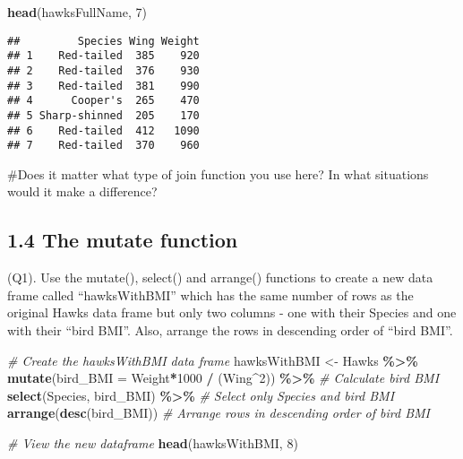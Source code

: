 \documentclass[
]{article}
\newenvironment{Shaded}{\begin{snugshade}}{\end{snugshade}}
\newcommand{\AttributeTok}[1]{\textcolor[rgb]{0.13,0.29,0.53}{#1}}
\newcommand{\CommentTok}[1]{\textcolor[rgb]{0.56,0.35,0.01}{\textit{#1}}}
\newcommand{\DecValTok}[1]{\textcolor[rgb]{0.00,0.00,0.81}{#1}}
\newcommand{\FunctionTok}[1]{\textcolor[rgb]{0.13,0.29,0.53}{\textbf{#1}}}
\newcommand{\NormalTok}[1]{#1}
\newcommand{\OtherTok}[1]{\textcolor[rgb]{0.56,0.35,0.01}{#1}}
\newcommand{\SpecialCharTok}[1]{\textcolor[rgb]{0.81,0.36,0.00}{\textbf{#1}}}
\begin{document}
\begin{Shaded}
\begin{Highlighting}[]
\FunctionTok{head}\NormalTok{(hawksFullName, }\DecValTok{7}\NormalTok{)}
\end{Highlighting}
\end{Shaded}

\begin{verbatim}
##         Species Wing Weight
## 1    Red-tailed  385    920
## 2    Red-tailed  376    930
## 3    Red-tailed  381    990
## 4      Cooper's  265    470
## 5 Sharp-shinned  205    170
## 6    Red-tailed  412   1090
## 7    Red-tailed  370    960
\end{verbatim}

\#Does it matter what type of join function you use here? In what
situations would it make a difference?

\subsection{1.4 The mutate function}\label{the-mutate-function}

(Q1). Use the mutate(), select() and arrange() functions to create a new
data frame called ``hawksWithBMI'' which has the same number of rows as
the original Hawks data frame but only two columns - one with their
Species and one with their ``bird BMI''. Also, arrange the rows in
descending order of ``bird BMI''.

\begin{Shaded}
\begin{Highlighting}[]
\CommentTok{\# Create the hawksWithBMI data frame}
\NormalTok{hawksWithBMI }\OtherTok{\textless{}{-}}\NormalTok{ Hawks }\SpecialCharTok{\%\textgreater{}\%}
  \FunctionTok{mutate}\NormalTok{(}\AttributeTok{bird\_BMI =}\NormalTok{ Weight}\SpecialCharTok{*}\DecValTok{1000} \SpecialCharTok{/}\NormalTok{ (Wing}\SpecialCharTok{\^{}}\DecValTok{2}\NormalTok{)) }\SpecialCharTok{\%\textgreater{}\%}  \CommentTok{\# Calculate bird BMI}
  \FunctionTok{select}\NormalTok{(Species, bird\_BMI) }\SpecialCharTok{\%\textgreater{}\%}              \CommentTok{\# Select only Species and bird BMI}
  \FunctionTok{arrange}\NormalTok{(}\FunctionTok{desc}\NormalTok{(bird\_BMI))                    }\CommentTok{\# Arrange rows in descending order of bird BMI}

\CommentTok{\# View the new dataframe}
\FunctionTok{head}\NormalTok{(hawksWithBMI, }\DecValTok{8}\NormalTok{)}
\end{Highlighting}
\end{Shaded}
\end{document}
